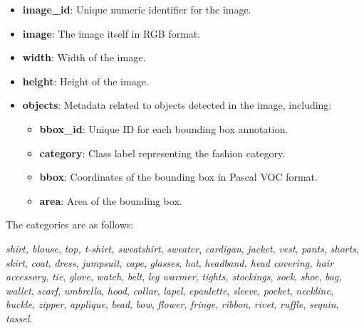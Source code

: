 \vspace{-1.25em}
\begin{itemize}
    \setlength\itemsep{-1.5em}
    \item \textbf{image\_id}: Unique numeric identifier for the image.
    \item \textbf{image}: The image itself in RGB format.
    \item \textbf{width}: Width of the image.
    \item \textbf{height}: Height of the image.
    \item \textbf{objects}: Metadata related to objects detected in the image, including:
          \vspace{-1.25em}
          \begin{itemize}
              \setlength\itemsep{-1.5em}
              \item \textbf{bbox\_id}: Unique ID for each bounding box annotation.
              \item \textbf{category}: Class label representing the fashion category.
              \item \textbf{bbox}: Coordinates of the bounding box in Pascal VOC format.
              \item \textbf{area}: Area of the bounding box.
          \end{itemize}
\end{itemize}

The categories are as follows:
\begin{center}
\begin{minipage}{0.6\textwidth}
    \textit{shirt, blouse}, \textit{top, t-shirt, sweatshirt}, \textit{sweater}, \textit{cardigan}, \textit{jacket}, \textit{vest}, \textit{pants}, \textit{shorts}, \textit{skirt}, \textit{coat}, \textit{dress}, \textit{jumpsuit}, \textit{cape}, \textit{glasses}, \textit{hat}, \textit{headband, head covering, hair accessory}, \textit{tie}, \textit{glove}, \textit{watch}, \textit{belt}, \textit{leg warmer}, \textit{tights, stockings}, \textit{sock}, \textit{shoe}, \textit{bag, wallet}, \textit{scarf}, \textit{umbrella}, \textit{hood}, \textit{collar}, \textit{lapel}, \textit{epaulette}, \textit{sleeve}, \textit{pocket}, \textit{neckline}, \textit{buckle}, \textit{zipper}, \textit{applique}, \textit{bead}, \textit{bow}, \textit{flower}, \textit{fringe}, \textit{ribbon}, \textit{rivet}, \textit{ruffle}, \textit{sequin}, \textit{tassel}.
\end{minipage}
\end{center}

